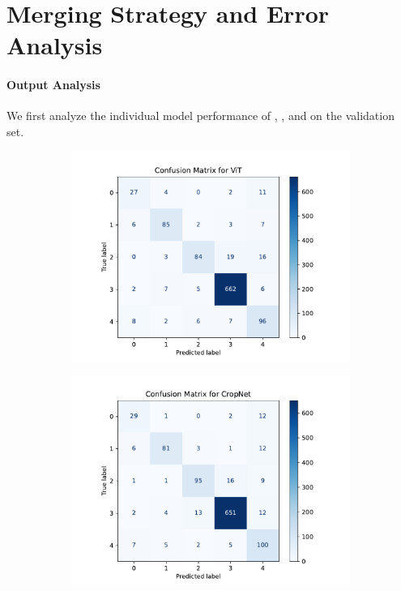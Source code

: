 \section{Merging Strategy and Error Analysis}\label{sec:voting}

\paragraph{Output Analysis}
We first analyze the individual model performance of \VIT{}, \CROP{}, and \CONV{} on the validation set.
\begin{figure}[htbp]
    \centering
    \begin{subfigure}{0.32\textwidth}
        \centering
        \includegraphics[width=\linewidth]{graphs/ModelMergeStudy/ViT.pdf}
        \caption{\VIT}
    \end{subfigure}
    \begin{subfigure}{0.32\textwidth}
        \centering
        \includegraphics[width=\linewidth]{graphs/ModelMergeStudy/CropNet.pdf}

\end{subfigure}
\end{figure}
